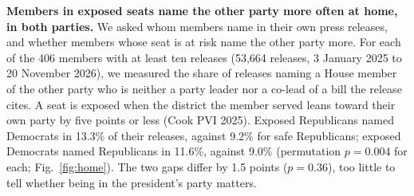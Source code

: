 %

\textbf{Members in exposed seats name the other party more often at home, in both parties.} We asked whom members name in their own press releases, and whether members whose seat is at risk name the other party more. For each of the 406 members with at least ten releases (53,664 releases, 3 January 2025 to 20 November 2026), we measured the share of releases naming a House member of the other party who is neither a party leader nor a co-lead of a bill the release cites. A seat is exposed when the district the member served leans toward their own party by five points or less (Cook PVI 2025). Exposed Republicans named Democrats in 13.3\% of their releases, against 9.2\% for safe Republicans; exposed Democrats named Republicans in 11.6\%, against 9.0\% (permutation $p = 0.004$ for each; Fig.~\ref{fig:home}). The two gaps differ by 1.5 points ($p = 0.36$), too little to tell whether being in the president's party matters.

